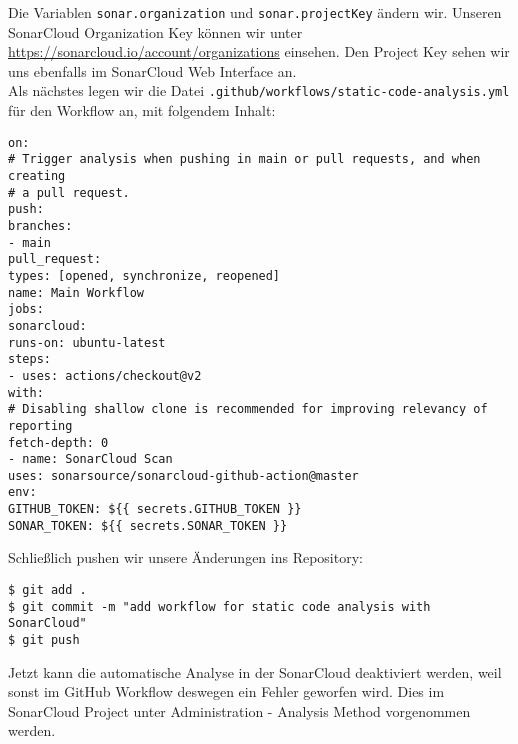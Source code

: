 \noindent
Die Variablen \verb|sonar.organization| und
\verb|sonar.projectKey| ändern wir.
Unseren SonarCloud Organization Key können wir unter
\url{https://sonarcloud.io/account/organizations}
einsehen. 
Den Project Key sehen wir uns ebenfalls im SonarCloud 
Web Interface an. \\

\noindent
Als nächstes legen wir die Datei
\verb|.github/workflows/static-code-analysis.yml| 
für den Workflow an, mit folgendem Inhalt:

\begin{verbatim}
on:
# Trigger analysis when pushing in main or pull requests, and when creating
# a pull request.
push:
branches:
- main
pull_request:
types: [opened, synchronize, reopened]
name: Main Workflow
jobs:
sonarcloud:
runs-on: ubuntu-latest
steps:
- uses: actions/checkout@v2
with:
# Disabling shallow clone is recommended for improving relevancy of reporting
fetch-depth: 0
- name: SonarCloud Scan
uses: sonarsource/sonarcloud-github-action@master
env:
GITHUB_TOKEN: ${{ secrets.GITHUB_TOKEN }}
SONAR_TOKEN: ${{ secrets.SONAR_TOKEN }}
\end{verbatim}

\noindent
Schließlich pushen wir unsere Änderungen ins Repository:

\begin{verbatim}
$ git add .
$ git commit -m "add workflow for static code analysis with SonarCloud"
$ git push
\end{verbatim}

\noindent
Jetzt kann die automatische Analyse in der SonarCloud
deaktiviert werden, weil sonst im GitHub Workflow
deswegen ein Fehler geworfen wird. Dies
im SonarCloud Project unter Administration - Analysis Method
vorgenommen werden.







